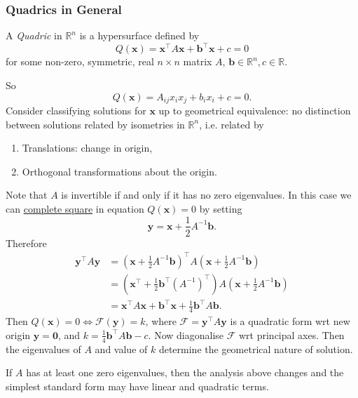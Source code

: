 \documentclass[a4paper]{article}
\begin{document}
    \subsubsection{Quadrics in General}
    \begin{definition}
      A \textit{Quadric} in $ \mathbb{R}^{n} $ is a hypersurface defined by
      \[
        Q(\mathbf{x})=\mathbf{x}^\top A\mathbf{x}+ \mathbf{b}^\top\mathbf{x}+c=0
      \]
      for some non-zero, symmetric, real $n\times n$ matrix $A$, $
      \mathbf{b}\in \mathbb{R}^{n},c\in \mathbb{R} $.
    \end{definition}
    So
    \[
      Q(\mathbf{x}) = A_{ij}x_i x_j+b_ix_i+c=0.
    \]
    Consider classifying solutions for $ \mathbf{x} $ up to
    geometrical equivalence: no distinction between solutions related
    by isometries in $ \mathbb{R}^{n} $, i.e. related by
    \begin{enumerate}
      \item Translations: change in origin,
      \item Orthogonal transformations about the origin.
    \end{enumerate}
    Note that $A$ is invertible if and only if it has no zero
    eigenvalues. In this case we can \underline{complete square} in
    equation $ Q(\mathbf{x})=0 $ by setting
    \[
      \mathbf{y} = \mathbf{x} + \frac{1}{2} A^{-1} \mathbf{b}.
    \]
    Therefore
    \begin{align*}
      \mathbf{y}^\top A\mathbf{y} &= \left( \mathbf{x} + \frac{1}{2}
      A^{-1} \mathbf{b} \right)^\top A \left( \mathbf{x} +
      \frac{1}{2} A^{-1} \mathbf{b} \right)\\
      &= \left( \mathbf{x}^\top +\frac{1}{2} \mathbf{b}^\top
      (A^{-1})^\top \right)A \left( \mathbf{x} + \frac{1}{2} A^{-1}
      \mathbf{b} \right)\\
      &=\mathbf{x}^\top A\mathbf{x}+\mathbf{b}^\top
      \mathbf{x}+\frac{1}{4}\mathbf{b}^\top A\mathbf{b}.
    \end{align*}
    Then $ Q(\mathbf{x})=0 \Leftrightarrow \mathcal{F}(\mathbf{y})=k
    $, where $ \mathcal{F}= \mathbf{y}^\top A\mathbf{y}$ is a
    quadratic form wrt new origin $ \mathbf{y}=\mathbf{0} $, and $ k=
    \frac{1}{4}\mathbf{b}^\top A\mathbf{b}-c$. Now diagonalise $
    \mathcal{F}$ wrt principal axes. Then the eigenvalues of $A$ and
    value of $k$ determine the geometrical nature of solution.
    \begin{remark}
      If $A$ has at least one zero eigenvalues, then the analysis
      above changes and the simplest standard form may have linear
      and quadratic terms.
    \end{remark}
\end{document}
